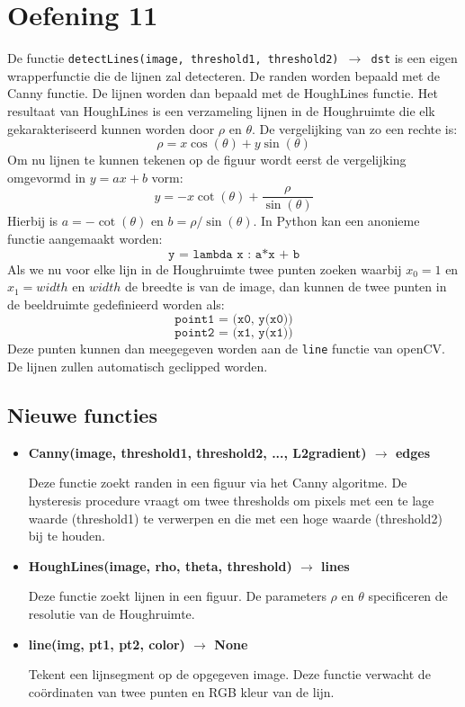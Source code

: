 \documentclass{article}
\begin{document}
	\section*{Oefening 11}
	De functie \texttt{detectLines(image, threshold1, threshold2) $\rightarrow$ dst} is een eigen wrapperfunctie die de lijnen zal detecteren. De randen worden bepaald met de Canny functie. De lijnen worden dan bepaald met de HoughLines functie. Het resultaat van HoughLines is een verzameling lijnen in de Houghruimte die elk gekarakteriseerd kunnen worden door $\rho$ en $\theta$. De vergelijking van zo een rechte is:
	$$\rho = x\cos(\theta) + y\sin(\theta)$$
	Om nu lijnen te kunnen tekenen op de figuur wordt eerst de vergelijking omgevormd in $y = ax + b$ vorm:
	$$y = -x\cot(\theta) + \frac{\rho}{\sin(\theta)}$$
	Hierbij is $a = -\cot(\theta)$ en $b = \rho/\sin(\theta)$.
	In Python kan een anonieme functie aangemaakt worden:
	$$\texttt{y = lambda x : a*x + b}$$
	Als we nu voor elke lijn in de Houghruimte twee punten zoeken waarbij $x_0 = 1$ en $x_1 = width$ en $width$ de breedte is van de image, dan kunnen de twee punten in de beeldruimte gedefinieerd worden als:
	$$\texttt{point1 = (x0, y(x0))}$$
	$$\texttt{point2 = (x1, y(x1))}$$
	Deze punten kunnen dan meegegeven worden aan de \texttt{line} functie van openCV. De lijnen zullen automatisch geclipped worden.
	\subsection*{Nieuwe functies}
	\begin{itemize}
	\item \textbf{Canny(image, threshold1, threshold2, ..., L2gradient) $\rightarrow$ edges}

	Deze functie zoekt randen in een figuur via het Canny algoritme. De hysteresis procedure vraagt om twee thresholds om pixels met een te lage waarde (threshold1) te verwerpen en die met een hoge waarde (threshold2) bij te houden.
	\item \textbf{HoughLines(image, rho, theta, threshold) $\rightarrow$ lines}
	
	Deze functie zoekt lijnen in een figuur. De parameters $\rho$ en $\theta$ specificeren de resolutie van de Houghruimte.
	
	
	\item \textbf{line(img, pt1, pt2, color) $\rightarrow$ None}
	
	Tekent een lijnsegment op de opgegeven image. Deze functie verwacht de coördinaten van twee punten en RGB kleur van de lijn.
	\end{itemize}
\end{document}
